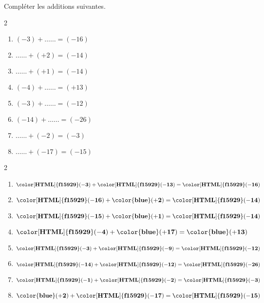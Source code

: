 \begin{exercice*}
    Compléter les additions suivantes.
    \begin{multicols}2
        \begin{enumerate}            
            \item $ (-3) + \ldots\ldots = (-16) $
            \item $ \ldots\ldots + (+2) = (-14) $
            \item $ \ldots\ldots + (+1) = (-14) $
            \item $ (-4) + \ldots\ldots = (+13) $
            \item $ (-3) + \ldots\ldots = (-12) $
            \item $ (-14) + \ldots\ldots = (-26) $
            \item $ \ldots\ldots + (-2) = (-3) $
            \item $ \ldots\ldots + (-17) = (-15) $          
        \end{enumerate}
    \end{multicols}

\end{exercice*}
\begin{corrige}
    \phantom{rrr}    
    \begin{multicols}2
        \begin{enumerate}
            \item $ \mathbf{{\color[HTML]{f15929}(-3)}} + \mathbf{{\color[HTML]{f15929}(-13)}} = \mathbf{{\color[HTML]{f15929}(-16)}} $
            \item $ \mathbf{{\color[HTML]{f15929}(-16)}} + \mathbf{{\color{blue}(+2)}} = \mathbf{{\color[HTML]{f15929}(-14)}} $
            \item $ \mathbf{{\color[HTML]{f15929}(-15)}} + \mathbf{{\color{blue}(+1)}} = \mathbf{{\color[HTML]{f15929}(-14)}} $
            \item $ \mathbf{{\color[HTML]{f15929}(-4)}} + \mathbf{{\color{blue}(+17)}} = \mathbf{{\color{blue}(+13)}} $
            \item $ \mathbf{{\color[HTML]{f15929}(-3)}} + \mathbf{{\color[HTML]{f15929}(-9)}} = \mathbf{{\color[HTML]{f15929}(-12)}} $
            \item $ \mathbf{{\color[HTML]{f15929}(-14)}} + \mathbf{{\color[HTML]{f15929}(-12)}} = \mathbf{{\color[HTML]{f15929}(-26)}} $
            \item $ \mathbf{{\color[HTML]{f15929}(-1)}} + \mathbf{{\color[HTML]{f15929}(-2)}} = \mathbf{{\color[HTML]{f15929}(-3)}} $
            \item $ \mathbf{{\color{blue}(+2)}} + \mathbf{{\color[HTML]{f15929}(-17)}} = \mathbf{{\color[HTML]{f15929}(-15)}} $
        \end{enumerate}   
    \end{multicols}
\end{corrige}